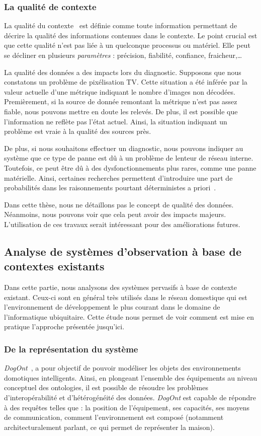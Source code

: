 \subsubsection{La qualité de contexte}
La qualité du contexte~\cite{Buchholz:quality} est définie comme toute information permettant de décrire la qualité des informations contenues dans le contexte. Le point crucial est que cette qualité n'est pas liée à un quelconque processus ou matériel. Elle peut se décliner en plusieurs \textit{paramètres} : précision, fiabilité, confiance, fraicheur,\dots{}

La qualité des données a des impacts lors du diagnostic. Supposons que nous constatons un problème de pixélisation TV. Cette situation a été inférée par la valeur actuelle d'une métrique indiquant le nombre d'images non décodées. Premièrement, si la source de donnée remontant la métrique n'est pas assez fiable, nous pouvons mettre en doute les relevés. De plus, il est possible que l'information ne reflète pas l'état actuel. Ainsi, la situation indiquant un problème est vraie à la qualité des sources près.

De plus, si nous souhaitons effectuer un diagnostic, nous pouvons indiquer au système que ce type de panne est dû à un problème de lenteur de réseau interne. Toutefois, ce peut être dû à des dysfonctionnements plus rares, comme une panne matérielle. Ainsi, certaines recherches permettent d'introduire une part de probabilités dans les raisonnements pourtant déterministes a priori~\cite{Padovitz:agent}.

Dans cette thèse, nous ne détaillons pas le concept de qualité des données. Néanmoins, nous pouvons voir que cela peut avoir des impacts majeurs. L'utilisation de ces travaux serait intéressant pour des améliorations futures.

\subsection{Analyse de systèmes d'observation à base de contextes existants}
Dans cette partie, nous analysons des systèmes pervasifs à base de contexte existant. Ceux-ci sont en général très utilisés dans le réseau domestique qui est l'environnement de développement le plus courant dans le domaine de l'informatique ubiquitaire. Cette étude nous permet de voir comment est mise en pratique l'approche présentée jusqu'ici.

\subsubsection{De la représentation du système}
\textit{DogOnt}~\cite{Bonino:dogont}, a pour objectif de pouvoir modéliser les objets des environnements domotiques intelligents. Ainsi, en plongeant l'ensemble des équipements au niveau conceptuel des ontologies, il est possible de résoudre les problèmes d'interopérabilité et d'hétérogénéité des données. \textit{DogOnt} est capable de répondre à des requêtes telles que : la position de l'équipement, ses capacités, ses moyens de communication, comment l'environnement est composé (notamment architecturalement parlant, ce qui permet de représenter la maison).

